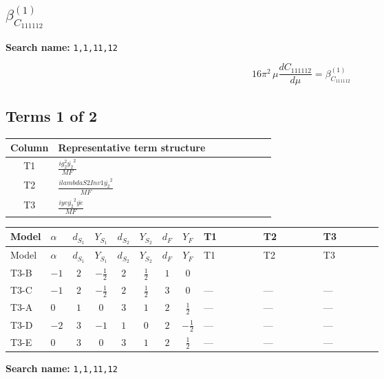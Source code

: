 \documentclass[8pt]{article}
\begin{document}
\begin{landscape}
\section*{$\beta_{C_{111112}}^{(1)}$}
\noindent\textbf{Search name: }\texttt{1,1,11,12}\par\smallskip
\[16\pi^2\,\mu\frac{d C_{111112}}{d\mu}=\beta_{C_{111112}}^{(1)}\]
\subsection*{Terms 1 of 2}
\begin{center}
\begin{tabular}{@{}c >{\raggedright\arraybackslash}p{0.82\linewidth}@{}}
\toprule
Column & Representative term structure \\
\midrule
T1 & \(\displaystyle \frac{i g_{2}^{2} \overline{y_{2}}^{2}}{MF}\) \\
\midrule
T2 & \(\displaystyle \frac{i lambdaS2Inv1 \overline{y_{2}}^{2}}{MF}\) \\
\midrule
T3 & \(\displaystyle \frac{i ye \overline{y_{2}}^{2} \overline{ye}}{MF}\) \\
\midrule
\bottomrule
\end{tabular}
\end{center}
\smallskip
\tiny
\begin{longtable}{@{}llcccccc >{\raggedright\arraybackslash}p{0.21\linewidth} >{\raggedright\arraybackslash}p{0.21\linewidth} >{\raggedright\arraybackslash}p{0.21\linewidth}@{}}
\toprule
Model & $\alpha$ & $d_{S_1}$ & $Y_{S_1}$ & $d_{S_2}$ & $Y_{S_2}$ & $d_F$ & $Y_F$ & T1 & T2 & T3 \\
\midrule
\endfirsthead
\toprule
Model & $\alpha$ & $d_{S_1}$ & $Y_{S_1}$ & $d_{S_2}$ & $Y_{S_2}$ & $d_F$ & $Y_F$ & T1 & T2 & T3 \\
\midrule
\endhead
T3-B & $-1$ & $2$ & $-\frac{1}{2}$ & $2$ & $\frac{1}{2}$ & $1$ & $0$ & \scriptsize\adjustbox{max width=\linewidth}{$\begin{gathered} - \frac{3 i g_{2}^{2} \overline{y_{2}}^{2}}{4 MF}\end{gathered}$} & \scriptsize\adjustbox{max width=\linewidth}{$\begin{gathered} - \frac{i lambdaS2Inv1 \overline{y_{2}}^{2}}{2 MF}\end{gathered}$} & \scriptsize\adjustbox{max width=\linewidth}{$\begin{gathered} \frac{i ye \overline{y_{2}}^{2} \overline{ye}}{4 MF}\end{gathered}$} \\
\midrule
T3-C & $-1$ & $2$ & $-\frac{1}{2}$ & $2$ & $\frac{1}{2}$ & $3$ & $0$ & --- & --- & --- \\
\midrule
T3-A & $0$ & $1$ & $0$ & $3$ & $1$ & $2$ & $\frac{1}{2}$ & --- & --- & --- \\
\midrule
T3-D & $-2$ & $3$ & $-1$ & $1$ & $0$ & $2$ & $-\frac{1}{2}$ & --- & --- & --- \\
\midrule
T3-E & $0$ & $3$ & $0$ & $3$ & $1$ & $2$ & $\frac{1}{2}$ & --- & --- & --- \\
\midrule
\bottomrule
\end{longtable}
\clearpage
\noindent\textbf{Search name: }\texttt{1,1,11,12}\par\smallskip

\end{landscape}
\end{document}
